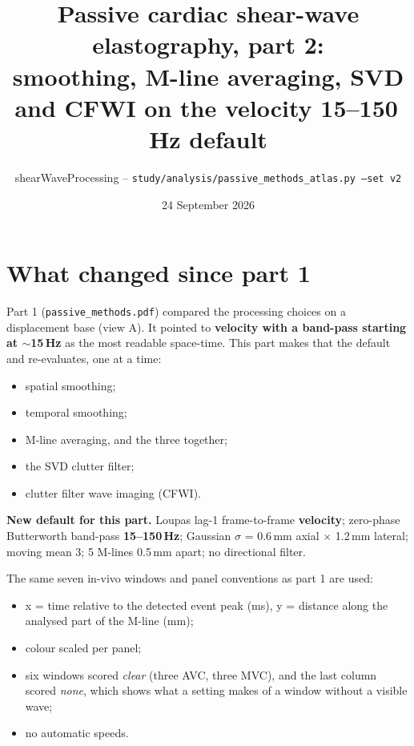 \documentclass[10pt]{article}
\title{Passive cardiac shear-wave elastography, part 2:\\ smoothing, M-line averaging, SVD and CFWI on the velocity 15--150\,Hz default}
\author{shearWaveProcessing -- \texttt{study/analysis/passive\_methods\_atlas.py --set v2}}
\date{24 September 2026}
\begin{document}
\maketitle

\section*{What changed since part 1}

Part 1 (\texttt{passive\_methods.pdf}) compared the processing choices on a displacement base
(view A). It pointed to \textbf{velocity with a band-pass starting at $\sim$15\,Hz} as the most
readable space-time. This part makes that the default and re-evaluates, one at a time:
\begin{itemize}
  \item spatial smoothing;
  \item temporal smoothing;
  \item M-line averaging, and the three together;
  \item the SVD clutter filter;
  \item clutter filter wave imaging (CFWI).
\end{itemize}

\textbf{New default for this part.} Loupas lag-1 frame-to-frame \textbf{velocity}; zero-phase
Butterworth band-pass \textbf{15--150\,Hz}; Gaussian $\sigma$ = 0.6\,mm axial $\times$ 1.2\,mm
lateral; moving mean 3; 5 M-lines 0.5\,mm apart; no directional filter.

The same seven in-vivo windows and panel conventions as part 1 are used:
\begin{itemize}
  \item x = time relative to the detected event peak (ms), y = distance along the analysed part
    of the M-line (mm);
  \item colour scaled per panel;
  \item six windows scored \emph{clear} (three AVC, three MVC), and the last column scored
    \emph{none}, which shows what a setting makes of a window without a visible wave;
  \item no automatic speeds.
\end{itemize}
\end{document}
